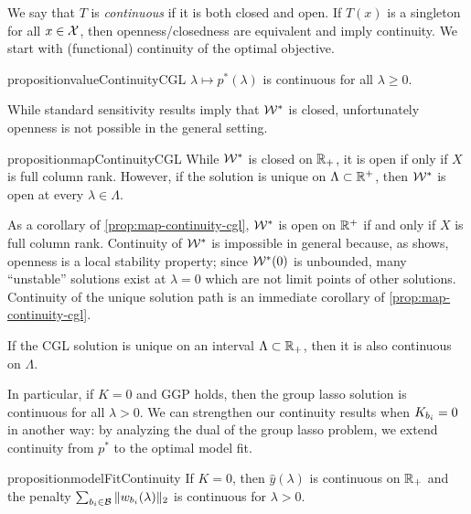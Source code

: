 We say that \( T \) is \emph{continuous} if it is both closed and open.
If \( T(x) \) is a singleton for all \( x \in \mathcal{X} \),
then openness/closedness are equivalent and imply continuity.
We start with (functional) continuity of the optimal objective.

\begin{restatable}{proposition}{valueContinuityCGL}\label{prop:value-continuity-cgl}
    \( \lambda \mapsto p^*(\lambda) \) is continuous for all
    \( \lambda \geq 0 \).
\end{restatable}

While standard sensitivity results imply that \( \mathcal{W}^* \) is closed,
unfortunately openness is not possible in the general setting.

\begin{restatable}{proposition}{mapContinuityCGL}\label{prop:map-continuity-cgl}
    While \( \mathcal{W}^* \) is closed on \( \mathbb{R}_+ \),
    it is open if only if \( X \) is full column rank.
    However, if the solution is unique on
    \( \Lambda \subset \mathbb{R}^+ \), then \( \mathcal{W}^* \)
    is open at every \( \lambda \in \Lambda \).
\end{restatable}

As a corollary of \cref{prop:map-continuity-cgl}, \( \mathcal{W}^* \) is open
on \( \mathbb{R}^+ \) if and only if \( X \) is full column rank.
Continuity of \( \mathcal{W}^* \) is impossible in general because,
as \citet{hogan1973point} shows, openness is a local stability property;
since \( \mathcal{W}^*(0) \) is unbounded, many ``unstable'' solutions
exist at \( \lambda = 0 \) which are not limit points of other solutions.
Continuity of the unique solution path is an immediate corollary of
\cref{prop:map-continuity-cgl}.

\begin{corollary}
    If the CGL solution is unique on an interval \( \Lambda \subset \mathbb{R}_+\),
    then it is also continuous on \( \Lambda \).
\end{corollary}

In particular, if \( K = 0 \) and GGP holds, then the group lasso solution
is continuous for all \( \lambda > 0 \).
We can strengthen our continuity results when \( K_{{b_i}} = 0 \) in another way:
by analyzing the dual of the group lasso problem,
we extend continuity from \( p^* \) to the optimal model fit.

\begin{restatable}{proposition}{modelFitContinuity}\label{prop:model-fit-continuity}
    If \( K = 0 \),
    then \( \hat y(\lambda)  \) is continuous on \( \mathbb{R}_+ \) and the penalty
    \( \sum_{{b_i} \in \mathcal{B}} \|w_{b_i}(\lambda)\|_2 \) is continuous
    for \( \lambda > 0 \).
\end{restatable}

